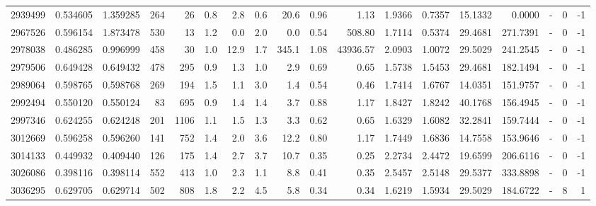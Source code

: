 \begin{tabular}{rrrrrrrrrrrrrrrlrr}
   2939499 & 0.534605 &   1.359285 &  264 &   26 &      0.8 &      2.8 &     0.6 &     20.6 &       0.96 &        1.13 &  1.9366 &  0.7357 &   15.1332 &    0.0000 &             - &        0 &         -1 \\
   2967526 & 0.596154 &   1.873478 &  530 &   13 &      1.2 &      0.0 &     2.0 &      0.0 &       0.54 &      508.80 &  1.7114 &  0.5374 &   29.4681 &  271.7391 &             - &        0 &         -1 \\
   2978038 & 0.486285 &   0.996999 &  458 &   30 &      1.0 &     12.9 &     1.7 &    345.1 &       1.08 &    43936.57 &  2.0903 &  1.0072 &   29.5029 &  241.2545 &             - &        0 &         -1 \\
   2979506 & 0.649428 &   0.649432 &  478 &  295 &      0.9 &      1.3 &     1.0 &      2.9 &       0.69 &        0.65 &  1.5738 &  1.5453 &   29.4681 &  182.1494 &             - &        0 &         -1 \\
   2989064 & 0.598765 &   0.598768 &  269 &  194 &      1.5 &      1.1 &     3.0 &      1.4 &       0.54 &        0.46 &  1.7414 &  1.6767 &   14.0351 &  151.9757 &             - &        0 &         -1 \\
   2992494 & 0.550120 &   0.550124 &   83 &  695 &      0.9 &      1.4 &     1.4 &      3.7 &       0.88 &        1.17 &  1.8427 &  1.8242 &   40.1768 &  156.4945 &             - &        0 &         -1 \\
   2997346 & 0.624255 &   0.624248 &  201 & 1106 &      1.1 &      1.5 &     1.3 &      3.3 &       0.62 &        0.65 &  1.6329 &  1.6082 &   32.2841 &  159.7444 &             - &        0 &         -1 \\
   3012669 & 0.596258 &   0.596260 &  141 &  752 &      1.4 &      2.0 &     3.6 &     12.2 &       0.80 &        1.17 &  1.7449 &  1.6836 &   14.7558 &  153.9646 &             - &        0 &         -1 \\
   3014133 & 0.449932 &   0.409440 &  126 &  175 &      1.4 &      2.7 &     3.7 &     10.7 &       0.35 &        0.25 &  2.2734 &  2.4472 &   19.6599 &  206.6116 &             - &        0 &         -1 \\
   3026086 & 0.398116 &   0.398114 &  552 &  413 &      1.0 &      2.3 &     1.1 &      8.8 &       0.41 &        0.35 &  2.5457 &  2.5148 &   29.5377 &  333.8898 &             - &        0 &         -1 \\
   3036295 & 0.629705 &   0.629714 &  502 &  808 &      1.8 &      2.2 &     4.5 &      5.8 &       0.34 &        0.34 &  1.6219 &  1.5934 &   29.5029 &  184.6722 &             - &        8 &          1 \\

\end{tabular}
